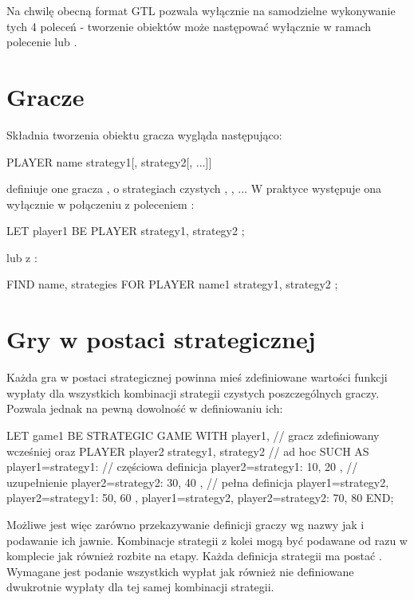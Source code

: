 \documentclass[polish]{standalone}
\begin{document}
Na chwilę obecną format GTL pozwala wyłącznie na samodzielne wykonywanie tych 4 poleceń - tworzenie obiektów może 
następować wyłącznie w ramach polecenie  lub .

\section{Gracze}

Składnia tworzenia obiektu gracza wygląda następująco:

\begin{gtl}
PLAYER name { strategy1[, strategy2[, ...]] }
\end{gtl}

definiuje one gracza , o strategiach czystych , , ... W praktyce występuje
ona wyłącznie w połączeniu z poleceniem :

\begin{gtl}
LET player1 BE PLAYER { strategy1, strategy2 };
\end{gtl}

lub z :

\begin{gtl}
FIND name, strategies
 FOR PLAYER name1 { strategy1, strategy2 };
\end{gtl}

\section{Gry w postaci strategicznej}

Każda gra w postaci strategicznej powinna mieś zdefiniowane wartości funkcji wypłaty dla wszystkich kombinacji strategii
czystych poszczególnych graczy. Pozwala jednak na pewną dowolność w definiowaniu ich:

\begin{gtl}
LET game1 BE
  STRATEGIC GAME
  WITH
    player1, // gracz zdefiniowany wcześniej oraz
    PLAYER player2 { strategy1, strategy2 } // ad hoc
  SUCH AS
    { player1=strategy1: // częściowa definicja
     { player2=strategy1: 10, 20 }, // uzupełnienie
     { player2=strategy2: 30, 40 }
    },
    // pełna definicja
    { player1=strategy2, player2=strategy1: 50, 60 },
    { player1=strategy2, player2=strategy2: 70, 80 }
  END;
\end{gtl}

Możliwe jest więc zarówno przekazywanie definicji graczy wg nazwy jak i podawanie ich jawnie. Kombinacje strategii z
kolei mogą być podawane od razu w komplecie jak również rozbite na etapy. Każda definicja strategii ma postać
. Wymagane jest podanie
wszystkich wypłat jak również nie definiowane dwukrotnie wypłaty dla tej samej kombinacji strategii.
\end{document}
